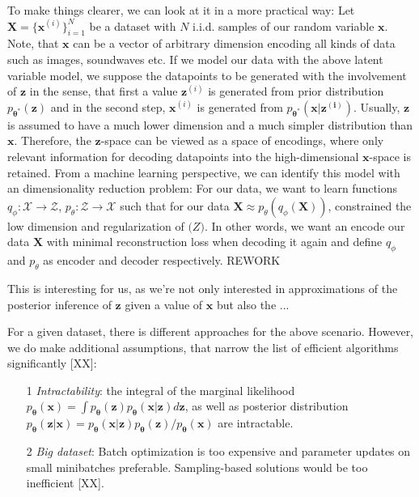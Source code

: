 \documentclass[12pt]{report}
\theoremstyle{definition}
\begin{document}
To make things clearer, we can  look at it in a more practical way: Let $\mathbf{X} = \{ \mathbf{x}^{(i)}\}_{i=1}^N$ be a dataset with $N$ i.i.d. samples of our random variable $\mathbf{x}$. Note, that $\mathbf{x}$ can be a vector of arbitrary dimension encoding all kinds of data such as images, soundwaves etc. If we model our data with the above latent variable model, we suppose the datapoints to be generated with the involvement of $\mathbf{z}$ in the sense, that first a value $\mathbf{z}^{(i)}$ is generated from prior distribution $p_{\mathbf{\theta^*}}(\mathbf{z})$ and in the second step, $\mathbf{x}^{(i)}$ is generated from $p_{\mathbf{\theta^*}}(\mathbf{x}|\mathbf{z^{(i)}})$. 
Usually, $\mathbf{z}$ is assumed to have a much lower dimension and a much simpler distribution than $\mathbf{x}$. Therefore, the $\mathbf{z}$-space can be viewed as a space of encodings, where only relevant information for decoding datapoints into the high-dimensional $\mathbf{x}$-space is retained. From a machine learning perspective, we can identify this model with an dimensionality reduction problem: For our data, we want to learn functions $q_{\phi}: \mathcal{X} \rightarrow \mathcal{Z}$, $p_{\theta}: \mathcal{Z} \rightarrow \mathcal{X}$ such that for our data $\mathbf{X} \approx p_{\theta}(q_{\phi}(\mathbf{X}))$, constrained the low dimension and regularization of $\mathcal(Z)$. In other words, we want an encode our data $\mathbf{X}$ with minimal reconstruction loss when decoding it again and define $q_{\phi}$ and $p_{\theta}$ as encoder and decoder respectively. REWORK


This is interesting for us, as we're not only interested in approximations of the posterior inference of $\mathbf{z}$ given a value of $\mathbf{x}$ but also the ... %

For a given dataset, there is different approaches for the above scenario. However, we do make additional assumptions, that narrow the list of efficient algorithms significantly [XX]:

\begin{itemize}
	\item[1] \emph{Intractability}: the integral of the marginal likelihood $p_{\mathbf{\theta}}(\mathbf{x}) = \int p_{\mathbf{\theta}}(\mathbf{z}) p_{\mathbf{\theta}}(\mathbf{x}|\mathbf{z}) d \mathbf{z}$, as well as posterior distribution $p_{\mathbf{\theta}}(\mathbf{z}|\mathbf{x}) = p_{\mathbf{\theta}}(\mathbf{x}|\mathbf{z}) p_{\mathbf{\theta}}(\mathbf{z}) / p_{\mathbf{\theta}}(\mathbf{x})$ are intractable.
	\item[2] \emph{Big dataset}: Batch optimization is too expensive and parameter updates on small minibatches preferable. Sampling-based solutions would be too inefficient [XX].
\end{itemize}
\end{document}
